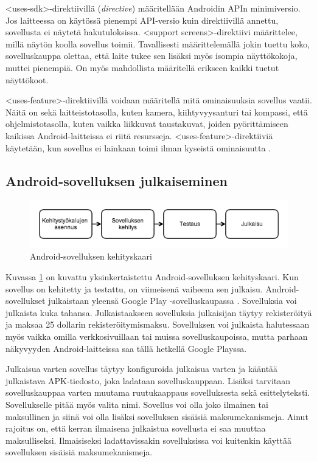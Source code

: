 <uses-sdk>-direktiivillä (\emph{directive}) määritellään Androidin APIn minimiversio. Jos laitteessa on käytössä pienempi API-versio kuin direktiivillä annettu, sovellusta ei näytetä hakutuloksissa. <support screens>-direktiivi määrittelee, millä näytön koolla sovellus toimii. Tavallisesti määrittelemällä jokin tuettu koko, sovelluskauppa olettaa, että laite tukee sen lisäksi myös isompia näyttökokoja, muttei pienempiä. On myös mahdollista määritellä erikseen kaikki tuetut näyttökoot.

<uses-feature>-direktiivillä voidaan määritellä mitä ominaisuuksia sovellus vaatii. Näitä on sekä laitteistotasolla, kuten kamera, kiihtyvyysanturi tai kompassi, että ohjelmistotasolla, kuten vaikka liikkuvat taustakuvat, joiden pyörittämiseen kaikissa Android-laitteissa ei riitä resursseja. <uses-feature>-direktiiviä käytetään, kun sovellus ei lainkaan toimi ilman kyseistä ominaisuutta \cite{android_compatibility}.

\subsection{Android-sovelluksen julkaiseminen}

\begin{figure}[htb]
\includegraphics[width=130mm]{kehityskaari.png}
\caption{Android-sovelluksen kehityskaari \protect\cite{android}} \label{publishing_overview}
\end{figure}

Kuvassa \ref{publishing_overview} on kuvattu yksinkertaistettu Android-sovelluksen kehityskaari. Kun sovellus on kehitetty ja testattu, on viimeisenä vaiheena sen julkaisu. Android-sovellukset julkaistaan yleensä Google Play -sovelluskaupassa \cite{google_play}. Sovelluksia voi julkaista kuka tahansa. Julkaistaakseen sovelluksia julkaisijan täytyy rekisteröityä ja maksaa 25 dollarin rekisteröitymismaksu. Sovelluksen voi julkaista halutessaan myös vaikka omilla verkkosivuillaan tai muissa sovelluskaupoissa, mutta parhaan näkyvyyden Android-laitteissa saa tällä hetkellä Google Playssa.

Julkaisua varten sovellus täytyy konfiguroida julkaisua varten ja kääntää julkaistava APK-tiedosto, joka ladataan sovelluskauppaan. Lisäksi tarvitaan sovelluskauppaa varten muutama ruutukaappaus sovelluksesta sekä esittelyteksti. Sovellukselle pitää myös valita nimi. Sovellus voi olla joko ilmainen tai maksullinen ja siinä voi olla lisäksi sovelluksen sisäisiä maksumekanismeja. Ainut rajoitus on, että kerran ilmaisena julkaistua sovellusta ei saa muuttaa maksulliseksi. Ilmaisiseksi ladattavissakin sovelluksissa voi kuitenkin käyttää sovelluksen sisäisiä maksumekanismeja.

